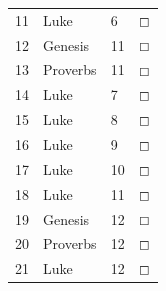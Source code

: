 \documentclass[11pt,landscape,twocolumn,letterpaper]{article}
\begin{document}
\begin{tabular}{p{0.5in}p{1.6in}p{1.3in}p{0.35in}}
  \textcolor[rgb]{0.00,0.00,1.00}{11} & \textcolor[rgb]{0.00,0.00,1.00}{Luke} & 6 & \textcolor[rgb]{0.00,0.00,1.00}{$\boxempty$}\\

  \textcolor[rgb]{0.00,0.00,1.00}{12} & \textcolor[rgb]{0.00,0.00,1.00}{\textcolor[rgb]{0.98,0.00,0.00}{Genesis}} & \textcolor[rgb]{0.98,0.00,0.00}{11} & \textcolor[rgb]{0.00,0.00,1.00}{$\boxempty$}\\

  \textcolor[rgb]{0.00,0.00,1.00}{13} & \textcolor[rgb]{0.00,0.00,1.00}{\textcolor[rgb]{0.98,0.00,0.00}{Proverbs}} & \textcolor[rgb]{0.98,0.00,0.00}{11} & \textcolor[rgb]{0.00,0.00,1.00}{$\boxempty$}\\

  \textcolor[rgb]{0.00,0.00,1.00}{14} & \textcolor[rgb]{0.00,0.00,1.00}{Luke} & 7 & \textcolor[rgb]{0.00,0.00,1.00}{$\boxempty$}\\

  \textcolor[rgb]{0.00,0.00,1.00}{15} & \textcolor[rgb]{0.00,0.00,1.00}{Luke} & 8 & \textcolor[rgb]{0.00,0.00,1.00}{$\boxempty$}\\

  \textcolor[rgb]{0.00,0.00,1.00}{16} & \textcolor[rgb]{0.00,0.00,1.00}{Luke} & 9 & \textcolor[rgb]{0.00,0.00,1.00}{$\boxempty$}\\

   \textcolor[rgb]{0.00,0.00,1.00}{17} & \textcolor[rgb]{0.00,0.00,1.00}{Luke} & 10 & \textcolor[rgb]{0.00,0.00,1.00}{$\boxempty$}\\

  \textcolor[rgb]{0.00,0.00,1.00}{18} & \textcolor[rgb]{0.00,0.00,1.00}{Luke} & 11 & \textcolor[rgb]{0.00,0.00,1.00}{$\boxempty$}\\

  \textcolor[rgb]{0.00,0.00,1.00}{19} & \textcolor[rgb]{0.00,0.00,1.00}{\textcolor[rgb]{0.98,0.00,0.00}{Genesis}} & \textcolor[rgb]{0.98,0.00,0.00}{12} & \textcolor[rgb]{0.00,0.00,1.00}{$\boxempty$}\\

  \textcolor[rgb]{0.00,0.00,1.00}{20} & \textcolor[rgb]{0.00,0.00,1.00}{\textcolor[rgb]{0.98,0.00,0.00}{Proverbs}} & \textcolor[rgb]{0.98,0.00,0.00}{12} & \textcolor[rgb]{0.00,0.00,1.00}{$\boxempty$}\\

  \textcolor[rgb]{0.00,0.00,1.00}{21} & \textcolor[rgb]{0.00,0.00,1.00}{Luke} & 12 & \textcolor[rgb]{0.00,0.00,1.00}{$\boxempty$}\\


 \end{tabular} 
\end{document}
